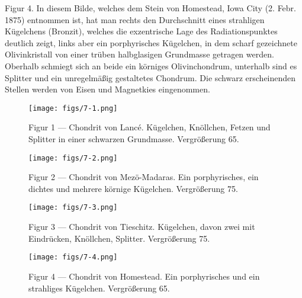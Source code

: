 \documentclass[a4paper, 11pt, oneside, polutonikogreek, german]{article}
\begin{document}
Figur 4. In diesem Bilde, welches dem Stein von Homestead, Iowa City (2. Febr. 1875) entnommen ist, hat man rechts den Durchschnitt eines strahligen Kügelchens (Bronzit), welches die exzentrische Lage des Radiationspunktes deutlich zeigt, links aber ein porphyrisches Kügelchen, in dem scharf gezeichnete Olivinkristall von einer trüben halbglasigen Grundmasse getragen werden. Oberhalb schmiegt sich an beide ein körniges Olivinchondrum, unterhalb sind es Splitter und ein unregelmäßig gestaltetes Chondrum. Die schwarz erscheinenden Stellen werden von Eisen und Magnetkies eingenommen.
\clearpage

\vspace*{\fill}
\begin{figure}[H]
\centering
\texttt{[image: figs/7-1.png]}
\caption{\small Figur 1 --- Chondrit von Lancé. Kügelchen, Knöllchen, Fetzen und Splitter in einer schwarzen Grundmasse. Vergrößerung 65.}
\end{figure}
\vspace*{\fill}
\clearpage

\vspace*{\fill}
\begin{figure}[H]
\centering
\texttt{[image: figs/7-2.png]}
\caption{\small Figur 2 --- Chondrit von Mezö-Madaras. Ein porphyrisches, ein dichtes und mehrere körnige Kügelchen. Vergrößerung 75.}
\end{figure}
\vspace*{\fill}
\clearpage

\vspace*{\fill}
\begin{figure}[H]
\centering
\texttt{[image: figs/7-3.png]}
\caption{\small Figur 3 --- Chondrit von Tieschitz. Kügelchen, davon zwei mit Eindrücken, Knöllchen, Splitter. Vergrößerung 75.}
\end{figure}
\vspace*{\fill}
\clearpage

\vspace*{\fill}
\begin{figure}[H]
\centering
\texttt{[image: figs/7-4.png]}
\caption{\small Figur 4 --- Chondrit von Homestead. Ein porphyrisches und ein strahliges Kügelchen. Vergrößerung 65.}
\end{figure}
\vspace*{\fill}
\clearpage
\end{document}
